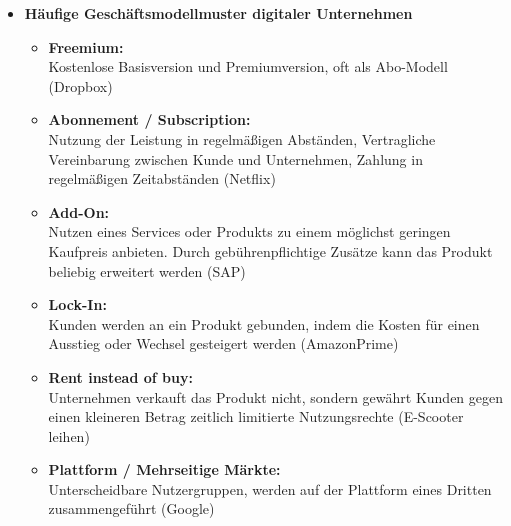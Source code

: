 \documentclass[12pt,a4paper]{article}
\begin{document}
\begin{itemize}
   \item \textbf{Häufige Geschäftsmodellmuster digitaler Unternehmen}
			\begin{itemize}
				\item \textbf{Freemium:}\\
						Kostenlose Basisversion und Premiumversion, oft als Abo-Modell (Dropbox)
				\item \textbf{Abonnement / Subscription:}\\
				      Nutzung der Leistung in regelmäßigen Abständen, Vertragliche Vereinbarung zwischen Kunde und Unternehmen, Zahlung in regelmäßigen Zeitabständen (Netflix)
				\item \textbf{Add-On:}\\
						Nutzen eines Services oder Produkts zu einem möglichst geringen Kaufpreis anbieten. Durch gebührenpflichtige Zusätze kann das Produkt beliebig erweitert werden (SAP)
				\item \textbf{Lock-In:}\\
						Kunden werden an ein Produkt gebunden, indem die Kosten für einen Ausstieg oder Wechsel gesteigert werden (AmazonPrime)
				\item \textbf{Rent instead of buy:}\\
						Unternehmen verkauft das Produkt nicht, sondern gewährt Kunden gegen einen kleineren Betrag zeitlich limitierte Nutzungsrechte (E-Scooter leihen)
				\item \textbf{Plattform / Mehrseitige Märkte:}\\
						Unterscheidbare Nutzergruppen, werden auf der Plattform eines Dritten zusammengeführt (Google)
			\end{itemize}
\end{itemize}
\end{document}
